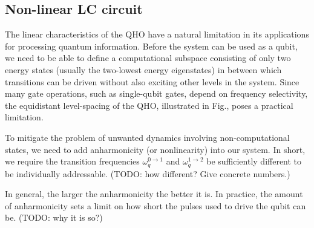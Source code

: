 \documentclass[11pt, oneside]{article}   	%
\begin{document}
\subsection{Non-linear LC circuit}
The linear characteristics of the QHO have a natural limitation in its applications for processing quantum information. 
Before the system can be used as a qubit, we need to be able to define a computational subspace consisting of only two energy states 
(usually the two-lowest energy eigenstates) in between which transitions can be driven without also exciting other levels in the system. 
Since many gate operations, such as single-qubit gates, depend on frequency selectivity, 
the equidistant level-spacing of the QHO, illustrated in Fig., poses a practical limitation.

To mitigate the problem of unwanted dynamics involving non-computational states, 
we need to add anharmonicity (or nonlinearity) into our system.
In short, we require the transition frequencies 
$\omega^{0 \to 1}_q$
and 
$\omega^{1 \to 2}_q$
be sufficiently different to be individually addressable. 
(TODO: how different? Give concrete numbers.)

In general, the larger the anharmonicity the better it is. 
In practice, the amount of anharmonicity sets a limit on how short the pulses used to drive the qubit can be. 
(TODO: why it is so?)
\end{document}
